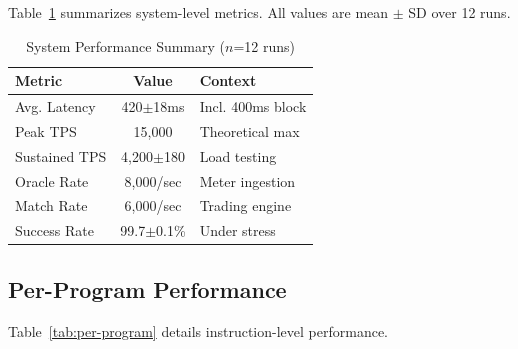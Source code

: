 \documentclass[conference]{IEEEtran}
\begin{document}
Table~\ref{tab:performance-summary} summarizes system-level metrics. All values are mean $\pm$ SD over 12 runs.

\begin{table}[htbp]
\caption{System Performance Summary ($n$=12 runs)}
\begin{center}
\small
\begin{tabular}{@{}lcp{2.8cm}@{}}
\toprule
\textbf{Metric} & \textbf{Value} & \textbf{Context} \\
\midrule
Avg. Latency & 420$\pm$18ms & Incl. 400ms block \\
Peak TPS & 15,000 & Theoretical max \\
Sustained TPS & 4,200$\pm$180 & Load testing \\
Oracle Rate & 8,000/sec & Meter ingestion \\
Match Rate & 6,000/sec & Trading engine \\
Success Rate & 99.7$\pm$0.1\% & Under stress \\
\bottomrule
\end{tabular}
\label{tab:performance-summary}
\end{center}
\end{table}

\subsection{Per-Program Performance}

Table~\ref{tab:per-program} details instruction-level performance.
\end{document}
